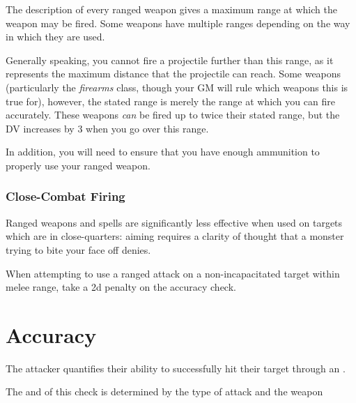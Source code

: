 The description of every ranged weapon gives a maximum range at which the weapon may be fired. Some weapons have multiple ranges depending on the way in which they are used. 

Generally speaking, you cannot fire a projectile further than this range, as it represents the maximum distance that the projectile can reach. Some weapons (particularly the {\it firearms} class, though your GM will rule which weapons this is true for), however, the stated range is merely the range at which you can fire accurately. These weapons {\it can} be fired up to twice their stated range, but the DV increases by 3 when you go over this range.

In addition, you will need to ensure that you have enough ammunition to properly use your ranged weapon.


\subsubsection{Close-Combat Firing}

Ranged weapons and spells are significantly less effective when used on targets which are in close-quarters: aiming requires a clarity of thought that a monster trying to bite your face off denies. 

When attempting to use a ranged attack on a non-incapacitated target within melee range, take a 2d penalty on the accuracy check.

\section{Accuracy}

The attacker quantifies their ability to successfully hit their target through an . 

The  and  of this check is determined by the type of attack and the weapon 






